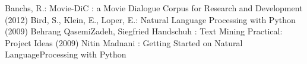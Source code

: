 \begin{thebibliography}{2}
%
Banchs, R.:
Movie-DiC : a Movie Dialogue Corpus for Research and Development (2012)
% 
Bird, S., Klein, E., Loper, E.: Natural Language Processing with Python (2009)
% 
Behrang QasemiZadeh, Siegfried Handschuh : Text Mining Practical: Project Ideas (2009)
% 
Nitin Madnani : Getting Started on Natural LanguageProcessing with Python
\end{thebibliography}

